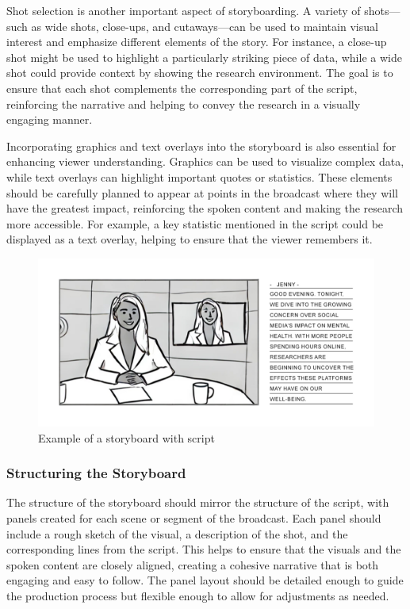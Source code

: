 \documentclass[
]{book}
\begin{document}
Shot selection is another important aspect of storyboarding. A variety of shots---such as wide shots, close-ups, and cutaways---can be used to maintain visual interest and emphasize different elements of the story. For instance, a close-up shot might be used to highlight a particularly striking piece of data, while a wide shot could provide context by showing the research environment. The goal is to ensure that each shot complements the corresponding part of the script, reinforcing the narrative and helping to convey the research in a visually engaging manner.

Incorporating graphics and text overlays into the storyboard is also essential for enhancing viewer understanding. Graphics can be used to visualize complex data, while text overlays can highlight important quotes or statistics. These elements should be carefully planned to appear at points in the broadcast where they will have the greatest impact, reinforcing the spoken content and making the research more accessible. For example, a key statistic mentioned in the script could be displayed as a text overlay, helping to ensure that the viewer remembers it.

\begin{figure}
\centering
\includegraphics[width=1\textwidth,height=\textheight]{images/storyboard-script.jpg}
\caption{Example of a storyboard with script}
\end{figure}

\subsubsection*{Structuring the Storyboard}\label{structuring-the-storyboard}

The structure of the storyboard should mirror the structure of the script, with panels created for each scene or segment of the broadcast. Each panel should include a rough sketch of the visual, a description of the shot, and the corresponding lines from the script. This helps to ensure that the visuals and the spoken content are closely aligned, creating a cohesive narrative that is both engaging and easy to follow. The panel layout should be detailed enough to guide the production process but flexible enough to allow for adjustments as needed.
\end{document}

